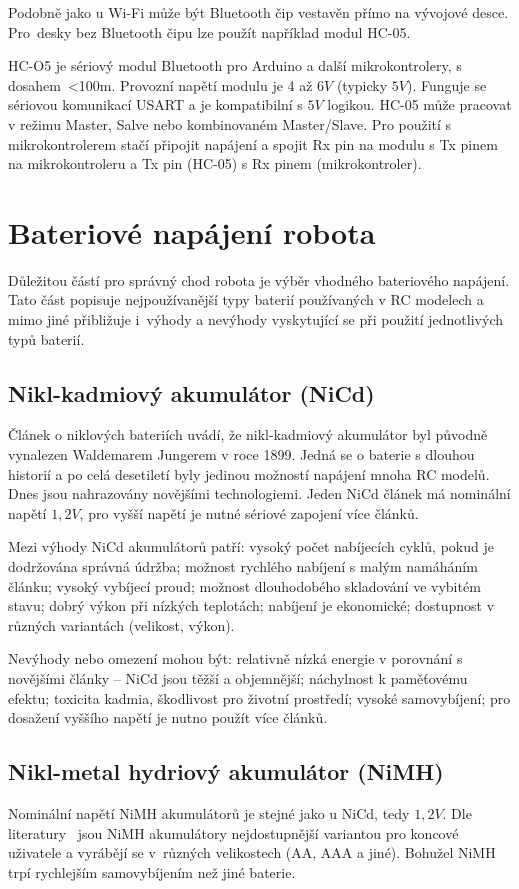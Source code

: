 Podobně jako u Wi-Fi může být Bluetooth čip vestavěn přímo na vývojové desce. Pro~desky bez Bluetooth čipu lze použít například modul HC-05.

HC-O5 \cite{bluetooth} je sériový modul Bluetooth pro Arduino a další mikrokontrolery, s dosahem~<100m. Provozní napětí modulu je 4 až $6V$ (typicky $5V$). Funguje se sériovou komunikací USART a je kompatibilní s $5V$ logikou. HC-05 může pracovat v režimu Master, Salve nebo kombinovaném Master/Slave. Pro použití s mikrokontrolerem stačí připojit napájení a spojit Rx pin na modulu s Tx pinem na mikrokontroleru a Tx pin (HC-05) s Rx pinem (mikrokontroler).




\section{Bateriové napájení robota}

Důležitou částí pro správný chod robota je výběr vhodného bateriového napájení. Tato část popisuje nejpoužívanější typy baterií používaných v RC modelech a mimo jiné přibližuje i~výhody a nevýhody vyskytující se při použití jednotlivých typů baterií.

\subsection*{Nikl-kadmiový akumulátor (NiCd)}
Článek o niklových bateriích \cite{batNickel} uvádí, že nikl-kadmiový akumulátor byl původně vynalezen Waldemarem Jungerem v roce 1899. Jedná se o baterie s dlouhou historií a po celá desetiletí byly jedinou možností napájení mnoha RC modelů. Dnes jsou nahrazovány novějšími technologiemi. Jeden NiCd článek má nominální napětí $1,2V$, pro vyšší napětí je nutné sériové zapojení více článků.

Mezi výhody NiCd akumulátorů patří: vysoký počet nabíjecích cyklů, pokud je dodržována správná údržba; možnost rychlého nabíjení s malým namáháním článku; vysoký vybíjecí proud; možnost dlouhodobého skladování ve vybitém stavu; dobrý výkon při nízkých teplotách; nabíjení je ekonomické; dostupnost v různých variantách (velikost, výkon).

Nevýhody nebo omezení mohou být: relativně nízká energie v porovnání s novějšími články -- NiCd jsou těžší a objemnější; náchylnost k paměťovému efektu; toxicita kadmia, škodlivost pro životní prostředí; vysoké samovybíjení; pro dosažení vyššího napětí je nutno použít více článků.


\subsection*{Nikl-metal hydriový akumulátor (NiMH)}
Nominální napětí NiMH akumulátorů je stejné jako u NiCd, tedy $1,2V$. Dle literatury~\cite{batNickel} jsou NiMH akumulátory nejdostupnější variantou pro koncové uživatele a vyrábějí se v~různých velikostech (AA, AAA a jiné). Bohužel NiMH trpí rychlejším samovybíjením než jiné baterie.

